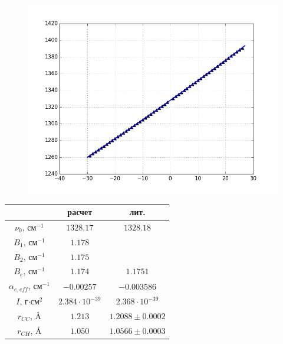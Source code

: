\documentclass[14pt]{extarticle}
\begin{document}
\clearpage
\begin{figure}[!ht]
	\centering
	\includegraphics[scale=0.6]{pictures/pic1.png}
\end{figure}

\begin{table}[!ht]
	\centering
	\begin{tabular}{|c|c|c|}
	\hline 
	& расчет & лит. \\
	\hline
	$\nu_0$, см$^{-1}$ & $1328.17$ & $1328.18$ \\
	$B_1$, см$^{-1}$ & $1.178$ &  \\
	$B_2$, см$^{-1}$ & $1.175$ &  \\
	$B_e$, см$^{-1}$ & $1.174$ &  $1.1751$ \\
	$\alpha_{e, eff}$, см$^{-1}$ & $-0.00257$ &  $-0.003586$ \\
	$I$, г$\cdot$см$^2$ & $2.384 \cdot 10^{-39}$ & $2.368 \cdot 10^{-39}$ \\
	$r_{CC}$, \AA & $1.213$ & $1.2088 \pm 0.0002$ \\
	$r_{CH}$, \AA & $1.050$ & $1.0566 \pm 0.0003$ \\
	\hline
	\end{tabular}
\end{table}
\end{document}
